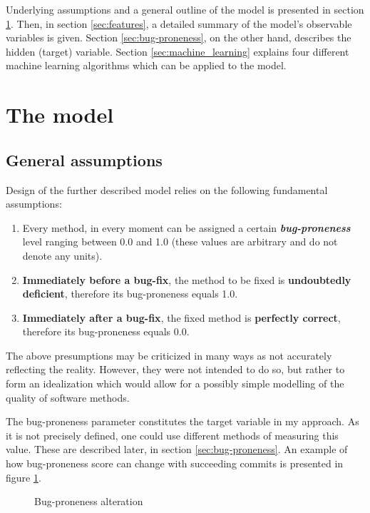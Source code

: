\documentclass{pracamgr}
\begin{document}
Underlying assumptions and a general outline of the model is presented in section \ref{sec:model}. Then, in section \ref{sec:features}, a detailed summary of the model's observable variables is given. Section \ref{sec:bug-proneness}, on the other hand, describes the hidden (target) variable. Section \ref{sec:machine_learning} explains four different machine learning algorithms which can be applied to the model.

\section{The model}
\label{sec:model}

\subsection{General assumptions}
\label{sec:general_assumptions}
Design of the further described model relies on the following fundamental assumptions:
\begin{enumerate}[label=(A\arabic*)]
	\item Every method, in every moment can be assigned a certain \textbf{\emph{bug-proneness}} level ranging between 0.0 and 1.0 (these values are arbitrary and do not denote any units).
	\item \textbf{Immediately before a bug-fix}, the method to be fixed is \textbf{undoubtedly deficient}, therefore its bug-proneness equals 1.0.
	\item \textbf{Immediately after a bug-fix}, the fixed method is \textbf{perfectly correct}, therefore its bug-proneness equals 0.0. 
\end{enumerate}
The above presumptions may be criticized in many ways as not accurately reflecting the reality. However, they were not intended to do so, but rather to form an idealization which would allow for a possibly simple modelling of the quality of software methods.

The bug-proneness parameter constitutes the target variable in my approach. As it is not precisely defined, one could use different methods of measuring this value. These are described later, in section \ref{sec:bug-proneness}. An example of how bug-proneness score can change with succeeding commits is presented in figure \ref{fig:bug_proneness}.

\begin{figure}[h]
\centering

\caption{Bug-proneness alteration}
\label{fig:bug_proneness}
\end{figure}
\end{document}
